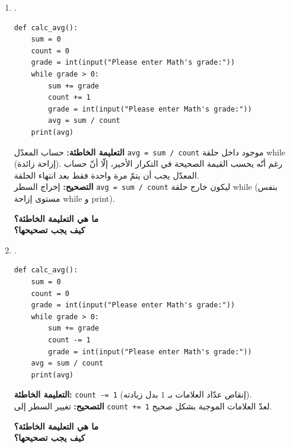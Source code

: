 \documentclass[14pt]{extarticle}
\begin{document}
\begin{enumerate}[label=\textbf{السؤال \arabic*:}, wide=0pt, itemsep=2.2em]
\begin{enumerate}[label=\textbf{مقطع \alph*:}, wide=0pt, itemsep=1.5em]
\item .
\begin{boxCode}
\begin{english}
\begin{verbatim}
def calc_avg():
    sum = 0
    count = 0
    grade = int(input("Please enter Math's grade:"))
    while grade > 0:
        sum += grade
        count += 1
        grade = int(input("Please enter Math's grade:"))
        avg = sum / count
    print(avg)
\end{verbatim}
\end{english}
\end{boxCode}
\ifwithsols
\begin{boxSolution}
\textbf{التعليمة الخاطئة:} حساب المعدّل \textenglish{\texttt{avg = sum / count}} موجود داخل حلقة \textenglish{while} (إزاحة زائدة). رغم أنّه يحسب القيمة الصحيحة في التكرار الأخير، إلّا أنّ حساب المعدّل يجب أن يتمّ مرة واحدة فقط بعد انتهاء الحلقة. \\
\textbf{التصحيح:} إخراج السطر \textenglish{\texttt{avg = sum / count}} ليكون خارج حلقة \textenglish{while} (بنفس مستوى إزاحة \textenglish{while} و \textenglish{print}).
\end{boxSolution}
\else
\textbf{ما هي التعليمة الخاطئة؟} \underline{\hspace{9.5cm}} \\
\textbf{كيف يجب تصحيحها؟} \underline{\hspace{10cm}}
\fi
\filbreak

\item .
\begin{boxCode}
\begin{english}
\begin{verbatim}
def calc_avg():
    sum = 0
    count = 0
    grade = int(input("Please enter Math's grade:"))
    while grade > 0:
        sum += grade
        count -= 1
        grade = int(input("Please enter Math's grade:"))
    avg = sum / count
    print(avg)
\end{verbatim}
\end{english}
\end{boxCode}
\ifwithsols
\begin{boxSolution}
\textbf{التعليمة الخاطئة:} \textenglish{\texttt{count -= 1}} (إنقاص عدّاد العلامات بـ $1$ بدل زيادته). \\
\textbf{التصحيح:} تغيير السطر إلى \textenglish{\texttt{count += 1}} لعدّ العلامات الموجبة بشكل صحيح.
\end{boxSolution}
\else
\textbf{ما هي التعليمة الخاطئة؟} \underline{\hspace{9.5cm}} \\
\textbf{كيف يجب تصحيحها؟} \underline{\hspace{10cm}}
\fi
\filbreak

\end{enumerate}
\filbreak

\end{enumerate}
\end{document}
